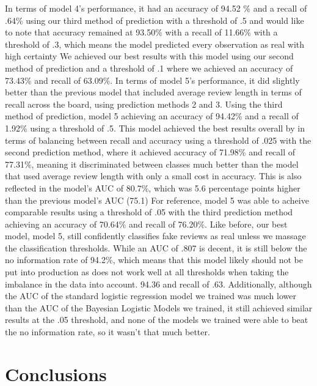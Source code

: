 \documentclass[man, floatsintext, 10pt]{apa6}
\begin{document}
 In terms of model 4's performance, it had an accuracy of 94.52 \% and a recall of .64\% using our third method of prediction with a threshold of .5 and would like to note that accuracy remained at 93.50\% with a recall of 11.66\% with a threshold of .3, which means the model predicted every observation as real with high certainty We achieved our best results with this model using our second method of prediction and a threshold of .1 where we achieved an accuracy of 73.43\% and recall of 63.09\%. In terms of model 5's performance, it did slightly better than the previous model that included average review length in terms of recall across the board, using prediction methods 2 and 3. Using the third method of prediction, model 5 achieving an accuracy of 94.42\% and a recall of 1.92\% using a threshold of .5. This model achieved the best results overall by in terms of balancing between recall and accuracy using a threshold of .025 with the second prediction method, where it achieved accuracy of 71.98\% and recall of 77.31\%, meaning it discriminated between classes much better than the model that used average review length with only a small cost in accuracy. This is also reflected in the model's AUC of 80.7\%, which was 5.6 percentage points higher than the previous model's AUC (75.1) For reference, model 5 was able to acheive comparable results using a threshold of .05 with the third prediction method achieving an accuracy of 70.64\% and recall of 76.20\%. Like before, our best model, model 5, still confidently classifies fake reviews as real unless we massage the classification thresholds. While an AUC of .807 is decent, it is still below the no information rate of 94.2\%, which means that this model likely should not be put into production as does not work well at all thresholds when taking the imbalance in the data into account.  94.36 and recall of .63. Additionally, although the AUC of the standard logistic regression model we trained was much lower than the AUC of the Bayesian Logistic Models we trained, it still achieved similar results at the .05 threshold, and none of the models we trained were able to beat the no information rate, so it wasn't that much better. 


\section{Conclusions} 
\end{document}
